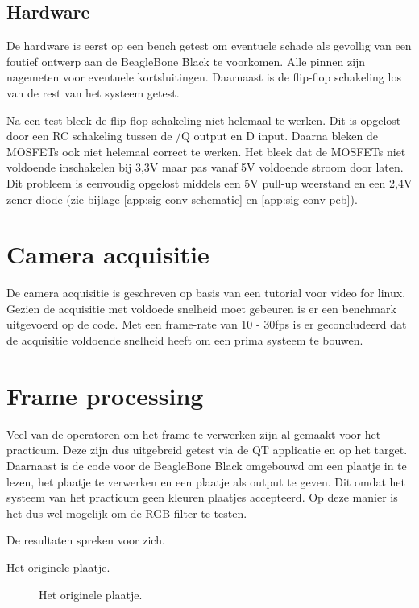 \subsection{Hardware}
\label{sub:gpioHard}

De hardware is eerst op een bench getest om eventuele schade als gevollig van
een foutief ontwerp aan de BeagleBone Black te voorkomen. Alle pinnen zijn
nagemeten voor eventuele kortsluitingen. Daarnaast is de flip-flop schakeling
los van de rest van het systeem getest.

Na een test bleek de flip-flop schakeling niet helemaal te werken. Dit is opgelost
door een RC schakeling tussen de /Q output en D input. Daarna bleken de MOSFETs
ook niet helemaal correct te werken. Het bleek dat de MOSFETs niet voldoende
inschakelen bij 3,3V maar pas vanaf 5V voldoende stroom door laten. Dit probleem
is eenvoudig opgelost middels een 5V pull-up weerstand en een 2,4V zener diode 
(zie bijlage \ref{app:sig-conv-schematic} en \ref{app:sig-conv-pcb}).

\section{Camera acquisitie}
\label{sec:camAcq}

De camera acquisitie is geschreven op basis van een tutorial voor video for
linux. Gezien de acquisitie met voldoede snelheid moet gebeuren is er een
benchmark uitgevoerd op de code. Met een frame-rate van 10 - 30fps is er
geconcludeerd dat de acquisitie voldoende snelheid heeft om een prima
systeem te bouwen.

\section{Frame processing}
\label{sec:framePross}

Veel van de operatoren om het frame te verwerken zijn al gemaakt voor het
practicum. Deze zijn dus uitgebreid getest via de QT applicatie en op het
target. Daarnaast is de code voor de BeagleBone Black omgebouwd om een
plaatje in te lezen, het plaatje te verwerken en een plaatje als output
te geven. Dit omdat het systeem van het practicum geen kleuren plaatjes
accepteerd. Op deze manier is het dus wel mogelijk om de RGB filter te
testen.

De resultaten spreken voor zich.

Het originele plaatje.
\begin{figure}
    \begin{center}
    \end{center}
    \caption{Het originele plaatje.}
    \label{fig:org}
\end{figure}


